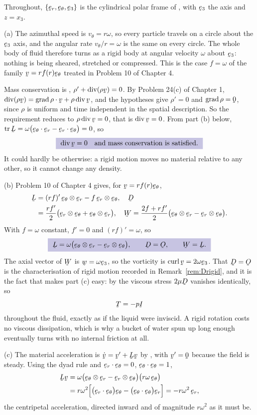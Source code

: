 \begin{solution}
Throughout, $\{\ber,\bet,\be_{3}\}$ is the cylindrical polar frame of
, with $\be_{3}$ the axis and $z=x_{3}$.

(a) The azimuthal speed is $v_{\theta}=r\omega$, so every
particle travels on a circle about the $\be_{3}$ axis, and the angular
rate $v_{\theta}/r=\omega$ is the same on every circle. The whole body of
fluid therefore turns as a rigid body at angular velocity $\omega$ about
$\be_{3}$: nothing is being sheared, stretched or compressed. This is
the case $f=\omega$ of the family $\bv=rf(r)\bet$ treated in Problem 10
of Chapter 4.

Mass conservation is , $\rho'+\dvg(\rho\bv)=0$. By Problem
24(c) of Chapter 1, $\dvg(\rho\bv)=\ip{\grad\rho}\bv+\rho\dvg\bv$, and
the hypotheses give $\rho'=0$ and $\grad\rho=\bze$, since $\rho$ is
uniform and time independent in the spatial description. So the
requirement reduces to $\rho\dvg\bv=0$, that is $\dvg\bv=0$. From part
(b) below, $\tr\bL=\omega\big(\ip{\bet}{\ber}-\ip{\ber}{\bet}\big)=0$,
so
\[
   \boxed{\ \dvg\bv=0\quad\text{and mass conservation is satisfied}.\ }
\]
It could hardly be otherwise: a rigid motion moves no material relative
to any other, so it cannot change any density.

(b) Problem 10 of Chapter 4 gives, for $\bv=rf(r)\bet$,
\[
\begin{aligned}
   \bL&=(rf)'\,\bet\otimes\ber-f\,\ber\otimes\bet,
   \quad
   \bD\\
   &=\frac{rf'}{2}\big(\ber\otimes\bet+\bet\otimes\ber\big),
   \quad
   \bW=\frac{2f+rf'}{2}\big(\bet\otimes\ber-\ber\otimes\bet\big).
\end{aligned}
\]
With $f=\omega$ constant, $f'=0$ and $(rf)'=\omega$, so
\[
   \boxed{\ \bL=\omega\big(\bet\otimes\ber-\ber\otimes\bet\big),
   \qquad \bD=\Ob,
   \qquad \bW=\bL. \ }
\]
The axial vector of $\bW$ is $\bw=\omega\be_{3}$, so the vorticity is
$\crl\bv=2\omega\be_{3}$. That $\bD=\Ob$ is the characterisation of
rigid motion recorded in Remark~\ref{rem:Drigid}, and it is the fact
that makes part (c) easy: by  the viscous stress
$2\mu\bD$ vanishes identically, so
\[
   \bT=-p\I
\]
throughout the fluid, exactly as if the liquid were inviscid. A rigid
rotation costs no viscous dissipation, which is why a bucket of water
spun up long enough eventually turns with no internal friction at all.

(c) The material acceleration is
$\dot\bv=\bv'+\bL\bv$ by , with $\bv'=\bze$ because the field
is steady. Using the dyad rule and $\ip{\ber}{\bet}=0$,
$\ip{\bet}{\bet}=1$,
\[
\begin{aligned}
   \bL\bv&=\omega\big(\bet\otimes\ber-\ber\otimes\bet\big)
     \big(r\omega\,\bet\big)\\
   &=r\omega^{2}\Big[\big(\ip{\ber}{\bet}\big)\bet
     -\big(\ip{\bet}{\bet}\big)\ber\Big]
   =-r\omega^{2}\,\ber ,
\end{aligned}
\]
the centripetal acceleration, directed inward and of magnitude
$r\omega^{2}$ as it must be.


\end{solution}
